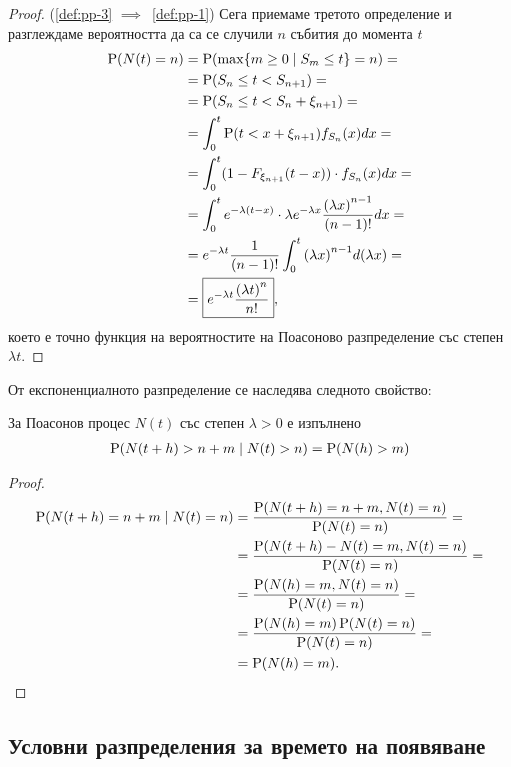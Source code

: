 \documentclass[numbers=endperiod, bibliography=totocnumbered]{scrartcl}
\begin{document}
\begin{proof}
  (\ref{def:pp-3} \( \implies \)~\ref{def:pp-1}) Сега приемаме третото определение и разглеждаме вероятността да са се случили \( n \) събития до момента \( t \)
  \begin{align*}
    \operatorname{P}(N(t) = n)
    &=
    \operatorname{P}(\max \{ m \geq 0 \mid S_m \leq t \} = n)
    = \\ &=
    \operatorname{P}(S_n \leq t < S_{n+1})
    = \\ &=
    \operatorname{P}(S_n \leq t < S_n + \xi_{n+1})
    = \\ &=
    \int_0^t \operatorname{P}(t < x + \xi_{n+1}) f_{S_n} (x) dx
    = \\ &=
    \int_0^t (1 - F_{\xi_{n+1}} (t - x)) \cdot f_{S_n} (x) dx
    = \\ &=
    \int_0^t e^{-\lambda (t-x)} \cdot \lambda e^{-\lambda x} \frac {{(\lambda x)}^{n-1}} {(n-1)!} dx
    = \\ &=
    e^{-\lambda t} \frac 1 {(n-1)!} \int_0^t {(\lambda x)}^{n-1} d(\lambda x)
    = \\ &=
    \boxed{e^{-\lambda t} \frac {{(\lambda t)}^n} {n!}},
  \end{align*}
  което е точно функция на вероятностите на Поасоново разпределение със степен \( \lambda t \).
\end{proof}

От експоненциалното разпределение се наследява следното свойство:
\begin{proposition}
  За Поасонов процес \( N(t) \) със степен \( \lambda > 0 \) е изпълнено
  \begin{align*}
    \operatorname{P}(N(t+h) > n + m \mid N(t) > n)
    =
    \operatorname{P}(N(h) > m)
  \end{align*}
\end{proposition}
\begin{proof}
  \begin{align*}
    \operatorname{P}(N(t+h) = n + m \mid N(t) = n)
    &=
    \frac {\operatorname{P}(N(t+h) = n + m, N(t) = n)} {\operatorname{P}(N(t) = n)}
    = \\ &=
    \frac {\operatorname{P}(N(t+h) - N(t) = m, N(t) = n)} {\operatorname{P}(N(t) = n)}
    = \\ &=
    \frac {\operatorname{P}(N(h) = m, N(t) = n)} {\operatorname{P}(N(t) = n)}
    = \\ &=
    \frac {\operatorname{P}(N(h) = m) \operatorname{P}(N(t) = n)} {\operatorname{P}(N(t) = n)}
    = \\ &=
    \operatorname{P}(N(h) = m).
  \end{align*}
\end{proof}

\subsection{Условни разпределения за времето на появяване}
\end{document}
